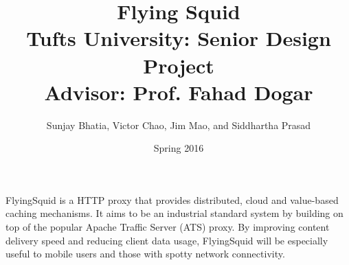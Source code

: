 \documentclass {article}
\title {
	{\textbf{Flying Squid}\\}
	{Tufts University: Senior Design Project\\}
	{\large Advisor: Prof. Fahad Dogar}
}
\author {Sunjay Bhatia, Victor Chao, Jim Mao, and Siddhartha Prasad}
\date{Spring 2016}
\begin{document}
\maketitle

\noindent
FlyingSquid is a HTTP proxy that provides distributed, cloud and value-based caching mechanisms. It aims to be an industrial standard system by building on top of the popular Apache Traffic Server (ATS) proxy. By improving content delivery speed and reducing client data usage, FlyingSquid will be especially useful to mobile users and those with spotty network connectivity.

\tableofcontents
\pagebreak









\pagebreak



\printbibliography
\end{document}
